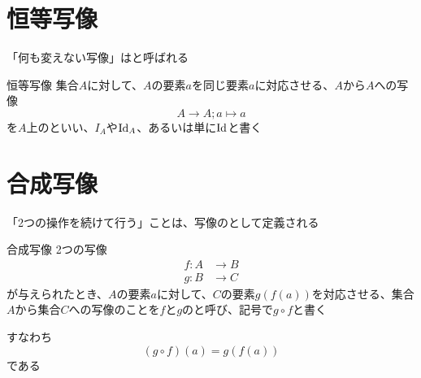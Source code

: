 \documentclass[../../../topic_mapping]{subfiles}
\begin{document}
\sectionline
\section{恒等写像}

「何も変えない写像」はと呼ばれる

\begin{definition}{恒等写像}
  集合$A$に対して、$A$の要素$a$を同じ要素$a$に対応させる、$A$から$A$への写像
  \begin{equation*}
    A \to A; a \mapsto a
  \end{equation*}
  を$A$上のといい、$I_A$や$\operatorname{Id}_A$、あるいは単に$\operatorname{Id}$と書く
\end{definition}

\sectionline
\section{合成写像}

「2つの操作を続けて行う」ことは、写像のとして定義される

\begin{definition}{合成写像}
  2つの写像
  \begin{align*}
    f\colon A & \to B \\
    g\colon B & \to C
  \end{align*}
  が与えられたとき、$A$の要素$a$に対して、$C$の要素$g(f(a))$を対応させる、集合$A$から集合$C$への写像のことを$f$と$g$のと呼び、記号で$g \circ f$と書く

  すなわち
  \begin{equation*}
    (g \circ f)(a) = g(f(a))
  \end{equation*}
  である
\end{definition}
\end{document}
